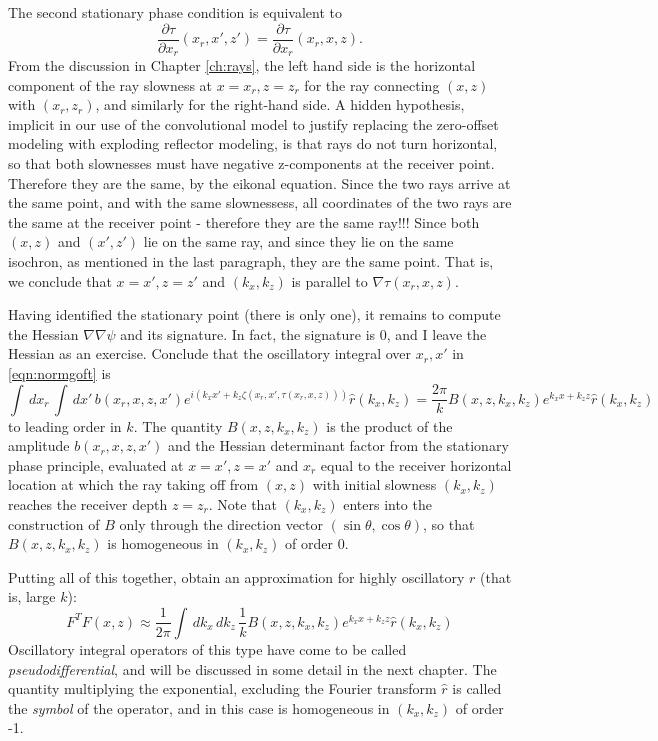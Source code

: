 The second stationary phase condition is equivalent to 
\begin{equation}
\label{normgorays}
\frac{\partial \tau}{\partial x_r}(x_r,x',z') = \frac{\partial \tau}{\partial x_r}(x_r,x,z).
\end{equation}
From the discussion in Chapter \ref{ch:rays}, the left hand side is the horizontal component of the ray slowness at $x=x_r, z=z_r$ for the ray connecting $(x,z)$ with $(x_r,z_r)$, and similarly for the right-hand side. A hidden hypothesis, implicit in our use of the convolutional model to justify replacing the zero-offset modeling with exploding reflector modeling, is that rays do not turn horizontal, so that both slownesses must have negative z-components at the receiver point. Therefore they are the same, by the eikonal equation. Since the two rays arrive at the same point, and with the same slownessess, all coordinates of the two rays are the same at the receiver point - therefore they are the same ray!!! Since both $(x,z)$ and $(x',z')$ lie on the same ray, and since they lie on the same isochron, as mentioned in the last paragraph, they are the same point. That is, we conclude that $x=x', z=z'$ and $(k_x,k_z)$ is parallel to $\nabla \tau(x_r,x,z)$. 

Having identified the stationary point (there is only one), it remains to compute the Hessian $\nabla \nabla \psi$ and its signature. In fact, the signature is $0$, and I leave the Hessian as an exercise. Conclude that the oscillatory integral over $x_r,x'$ in \ref{eqn:normgoft} is 
\begin{equation}
\label{eqn:normgosymb}
\int \, dx_r \, \int \, dx'\, b(x_r,x,z,x')e^{i(k_xx'+k_z\zeta(x_r,x',\tau(x_r,x,z)) )}\hat{r}(k_x,k_z)
= \frac{2\pi}{k} B(x,z,k_x,k_z) e^{k_x x+k_z z}\hat{r}(k_x,k_z)
\end{equation}
to leading order in $k$. The quantity $B(x,z,k_x,k_z)$ is the product of the amplitude $b(x_r,x,z,x')$ and the Hessian determinant factor from the stationary phase principle, evaluated at $x=x',z=x'$ and $x_r$ equal to the receiver horizontal location at which the ray taking off from $(x,z)$ with initial slowness $(k_x,k_z)$ reaches the receiver depth $z=z_r$. Note that $(k_x,k_z)$ enters into the construction of $B$ only through the direction vector $(\sin \theta, \cos \theta)$, so that $B(x,z,k_x,k_z)$ is homogeneous in $(k_x,k_z)$ of  order 0. 

Putting all of this together, obtain an approximation for highly oscillatory $r$ (that is, large $k$):
\begin{equation}
\label{eqn:normgopsido}
F^TF(x,z) \approx \frac{1}{2\pi}\int \,dk_x\,dk_z\,\frac{1}{k} B(x,z,k_x,k_z) e^{k_x x+k_z z}\hat{r}(k_x,k_z)
\end{equation}
Oscillatory integral operators of this type have come to be called {\em pseudodifferential}, and will be discussed in some detail in the next chapter. The quantity multiplying the exponential, excluding the Fourier transform $\hat{r}$ is called the {\em symbol} of the operator, and in this case is homogeneous in $(k_x,k_z) $ of order -1.

